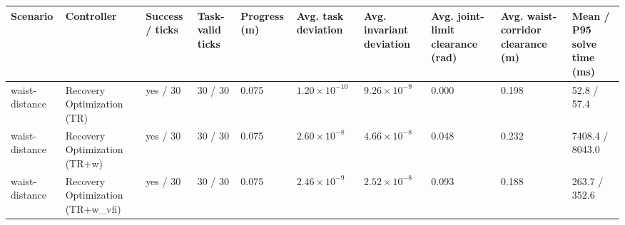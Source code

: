\begin{tabular}{llllllllll}
\toprule
Scenario & Controller & Success / ticks & Task-valid ticks & Progress (m) & Avg. task deviation & Avg. invariant deviation & Avg. joint-limit clearance (rad) & Avg. waist-corridor clearance (m) & Mean / P95 solve time (ms) \\
\midrule
waist-distance & Recovery Optimization (TR) & yes / 30 & 30 / 30 & 0.075 & $1.20\times 10^{-10}$ & $9.26\times 10^{-9}$ & 0.000 & 0.198 & 52.8 / 57.4 \\
waist-distance & Recovery Optimization (TR+w) & yes / 30 & 30 / 30 & 0.075 & $2.60\times 10^{-8}$ & $4.66\times 10^{-8}$ & 0.048 & 0.232 & 7408.4 / 8043.0 \\
waist-distance & Recovery Optimization (TR+w\_vfi) & yes / 30 & 30 / 30 & 0.075 & $2.46\times 10^{-9}$ & $2.52\times 10^{-8}$ & 0.093 & 0.188 & 263.7 / 352.6 \\
\bottomrule
\end{tabular}
